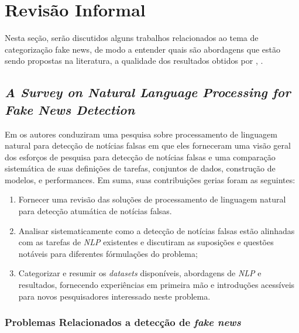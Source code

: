 \section{Revisão Informal}

Nesta seção, serão discutidos alguns trabalhos relacionados ao tema de
categorização fake news, de modo a entender quais são abordagens que estão sendo
propostas na literatura, a qualidade dos resultados obtidos por , .

\subsection{\textit{A Survey on Natural Language Processing for Fake News Detection}}

Em \cite{oshikawa2020} os autores conduziram uma pesquisa sobre processamento de linguagem natural para detecção de notícias falsas em que eles forneceram uma visão geral dos esforços de pesquisa para detecção de notícias falsas e uma comparação sistemática de suas definições de tarefas, conjuntos de dados, construção de modelos, e performances. Em suma, suas contribuições gerias foram as seguintes: \\

\begin{enumerate}
    \item Fornecer uma revisão das soluções de processamento de linguagem natural para detecção atumática de notícias falsas.
    
    \item Analisar sistematicamente como a detecção de notícias falsas estão alinhadas com as tarefas de \textit{NLP} existentes e discutiram as suposições e questões notáveis para diferentes fórmulações do problema;
    
    \item Categorizar e resumir os \textit{datasets} disponíveis, abordagens de \textit{NLP} e resultados, fornecendo experiências em primeira mão e introduções acessíveis para novos pesquisadores interessado neste problema.
\end{enumerate}

\subsubsection{Problemas Relacionados a detecção de \textit{fake news}}

